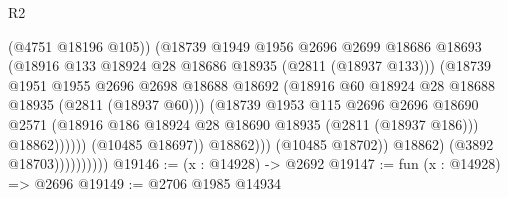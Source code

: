 \begin{lexlean}{R2}
\begin{coremodule}
                                          (@4751 @18196 @105))
                                        (@18739
                                          @1949
                                          @1956
                                          @2696
                                          @2699
                                          @18686
                                          @18693
                                          (@18916
                                            @133
                                            @18924
                                            @28
                                            @18686
                                            @18935
                                            (@2811 (@18937 @133)))
                                          (@18739
                                            @1951
                                            @1955
                                            @2696
                                            @2698
                                            @18688
                                            @18692
                                            (@18916
                                              @60
                                              @18924
                                              @28
                                              @18688
                                              @18935
                                              (@2811 (@18937 @60)))
                                            (@18739
                                              @1953
                                              @115
                                              @2696
                                              @2696
                                              @18690
                                              @2571
                                              (@18916
                                                @186
                                                @18924
                                                @28
                                                @18690
                                                @18935
                                                (@2811 (@18937 @186)))
                                              @18862))))))
                                  (@10485 @18697))
                                @18862)))
                          (@10485 @18702))
                        @18862)
                      (@3892 @18703))))))))))
@19146 := (x : @14928) -> @2692
@19147 := fun (x : @14928) => @2696
@19149 := @2706 @1985 @14934

\end{coremodule}
\end{lexlean}
